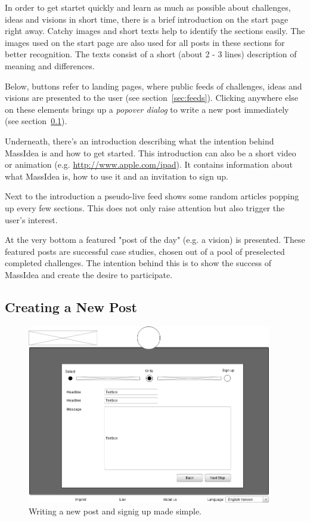 \documentclass[a4paper, notitlepage, oneside]{article}
\begin{document}
In order to get startet quickly and learn as much as possible about challenges, ideas and visions in short time, there is a brief introduction on the start page right away. Catchy images and short texts help to identify the sections easily. The images used on the start page are also used for all posts in these sections for better recognition. The texts consist of a short (about 2 - 3 lines) description of meaning and differences. 

Below, buttons refer to landing pages, where public feeds of challenges, ideas and visions are presented to the user (see section~\ref{sec:feeds}). Clicking anywhere else on these elements brings up a \emph{popover dialog} to write a new post immediately (see section~\ref{sub:public_post}).

Underneath, there's an introduction describing what the intention behind MassIdea is and how to get started. This introduction can also be a short video or animation (e.g. \url{http://www.apple.com/ipad}). It contains information about what MassIdea is, how to use it and an invitation to sign up.

Next to the introduction a pseudo-live feed shows some random articles popping up every few sections. This does not only raise attention but also trigger the user's interest.

At the very bottom a featured "post of the day" (e.g. a vision) is presented. These featured posts are successful case studies, chosen out of a pool of preselected completed challenges. The intention behind this is to show the success of MassIdea and create the desire to participate.

\subsection{Creating a New Post}
\label{sub:public_post}

\begin{figure}[htb]
	\centering
	\includegraphics[width=0.95\textwidth]{post}
	\caption{Writing a new post and signig up made simple.}
	\label{fig:post}
\end{figure}
\end{document}
